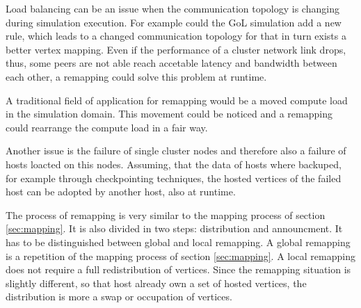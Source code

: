 Load balancing can be an issue when the communication topology is
changing during simulation execution. For example could the GoL
simulation add a new rule, which leads to a changed communication
topology for that in turn exists a better vertex mapping. Even if the
performance of a cluster network link drops, thus, some peers are not
able reach accetable latency and bandwidth between each other, a
remapping could solve this problem at runtime.

A traditional field of application for remapping would be
a moved compute load in the simulation domain. This movement
could be noticed and a remapping could rearrange the compute load
in a fair way.

Another issue is the failure of single cluster nodes and therefore
also a failure of hosts loacted on this nodes. Assuming, that the data
of hosts where backuped, for example through checkpointing techniques,
the hosted vertices of the failed host can be adopted by another host,
also at runtime.

The process of remapping is very similar to the mapping process of
section \ref{sec:mapping}.  It is also divided in two steps:
distribution and announcment. It has to be distinguished between
global and local remapping. A global remapping is a repetition of the
mapping process of section \ref{sec:mapping}. A local remapping does
not require a full redistribution of vertices.  Since the remapping
situation is slightly different, so that host already own a set of
hosted vertices, the distribution is more a swap or occupation of
vertices. 

\cleardoublepage

